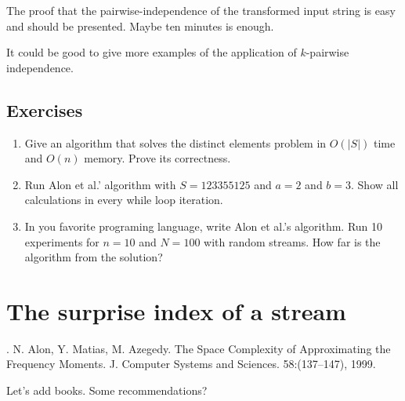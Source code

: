 \documentclass[12pt]{article}
\begin{document}
The proof that the pairwise-independence of the transformed input string is easy and should be presented. Maybe ten minutes is enough.
 
It could be good to give more examples of the application of $k$-pairwise independence.




\subsection{Exercises}


\begin{enumerate}

\item Give an algorithm that solves the distinct elements problem in $O(|S|)$ time
and $O(n)$ memory. Prove its correctness.

\item Run Alon et al.' algorithm with $S = 1 2 3 3 5 5 1 2 5$ and $a=2$ and $b=3$.
Show all calculations in every while loop iteration.

\item In you favorite programing language, write Alon et al.'s algorithm. 
Run 10 experiments for $n=10$ and $N=100$ with random streams.
How far is the algorithm from the solution?  
\end{enumerate}



\section{The surprise index of a stream}



\begin{thebibliography}{XXX}

 . N. Alon, Y. Matias, M. Azegedy. The Space Complexity of Approximating the Frequency Moments. J. Computer Systems and Sciences. 58:(137--147), 1999.

Let's add books. Some recommendations?

\end{thebibliography}
\end{document}
